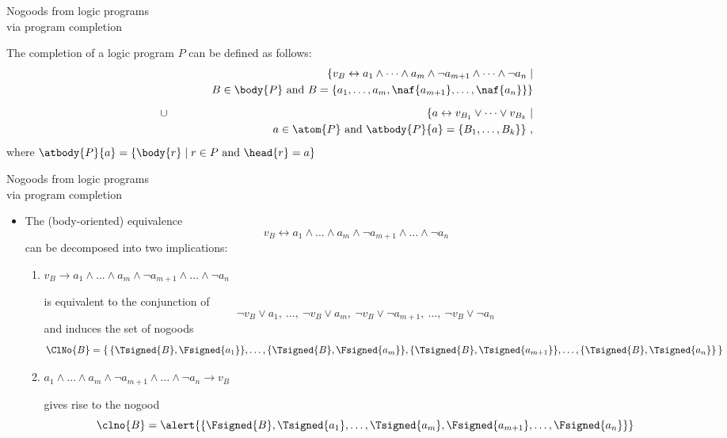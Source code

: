 \begin{frame}[c]{Nogoods from logic programs\\[-1ex]\normalsize via program completion}

The completion of a logic program $P$ can be defined as follows:
%
\begin{eqnarray*}
  &&
  \{
  v_B \leftrightarrow
  a_1          \wedge \dots \wedge a_m      \wedge
  \neg a_{m+1} \wedge \dots \wedge \neg a_n \mid
  \\&&\qquad\quad
  B \in\body{P} \text{ and }
  B = \{a_1,\dots,a_m,\naf{a_{m+1}},\dots,\naf{a_n}\}
  \}
  \\[6pt]
  &\cup&
  \{
  a \leftrightarrow
  v_{B_1} \vee \dots \vee v_{B_k}
  \mid
  \\&&\qquad\quad
  a\in\atom{P} \text{ and }
  \atbody{P}{a} = \{B_1,\dots,B_k\}
  \}\ ,
\end{eqnarray*}
%
where $\atbody{P}{a}=\{\body{r}\mid r\in P\text{ and }\head{r}=a\}$
\end{frame}
\begin{frame}{Nogoods from logic programs\\[-1ex]\normalsize via program completion}

  \begin{itemize}
  \item<1-> The (body-oriented) equivalence
    \[
    v_B \leftrightarrow
         a_1     \wedge\dots\wedge      a_m \wedge
    \neg a_{m+1} \wedge\dots\wedge \neg a_n
    \]
    can be decomposed into two implications:
    \medskip
    \begin{enumerate}
    \item<only@2>\normalsize
      \alert{%
      \(
      v_B \to
           a_1     \wedge\dots\wedge      a_m \wedge
      \neg a_{m+1} \wedge\dots\wedge \neg a_n
      \)}

      \smallskip
      is equivalent to the conjunction of
      \[
      \neg v_B \vee  a_1
      ,\ \dots,\
      \neg v_B \vee  a_m
      ,\
      \neg v_B \vee  \neg a_{m+1}
      ,\ \dots,\
      \neg v_B \vee  \neg a_n
      \]
      and induces the set of nogoods
      \alert{\small%
        \[
        \ClNo{B}
        =
        \{\,\{\Tsigned{B},\Fsigned{a_1}\},
        \dots,
        \{\Tsigned{B},\Fsigned{a_m}\},
        \{\Tsigned{B},\Tsigned{a_{m+1}}\},
        \dots,
        \{\Tsigned{B},\Tsigned{a_n}\}\,\}
        \]
      }
    \item<only@3->\normalsize
      \alert{%
      \(
      a_1          \wedge \dots \wedge a_m      \wedge
      \neg a_{m+1} \wedge \dots \wedge \neg a_n
      \rightarrow v_B
      \)}

      \smallskip
      gives rise to the nogood
      \[
      \clno{B}
      =
      \alert{\{\Fsigned{B},\Tsigned{a_1},\dots,\Tsigned{a_m},\Fsigned{a_{m+1}},\dots,\Fsigned{a_n}\}}
      \]
      \bigskip
  \end{enumerate}
\end{itemize}
\end{frame}

